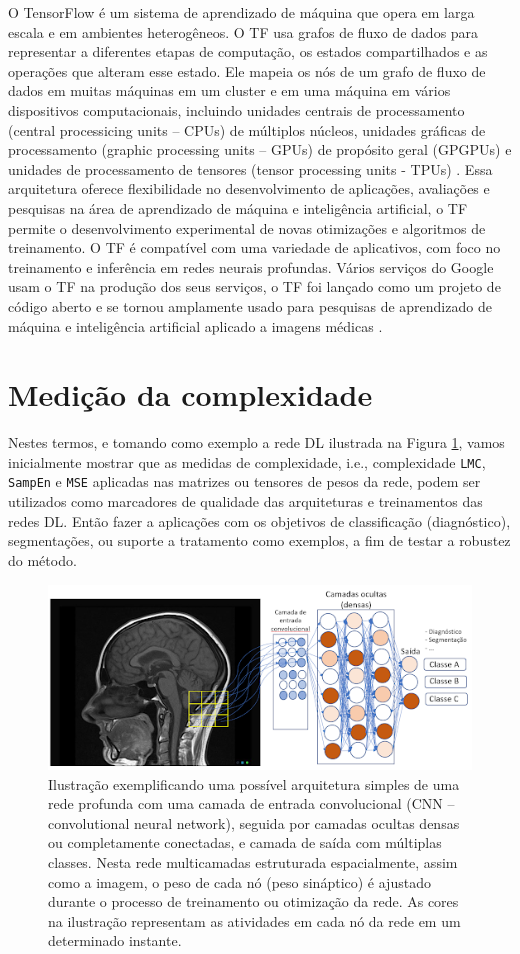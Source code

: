 \documentclass[
	12pt,				%
	openany,oneside,
	a4paper,			%
	english,			%
	brazil,				%
	]{abntex2}
\begin{document}
O TensorFlow é um sistema de aprendizado de máquina que opera em larga escala e em ambientes heterogêneos. O TF usa grafos de fluxo de dados para representar a diferentes etapas de computação, os estados compartilhados e as operações que alteram esse estado. Ele mapeia os nós de um grafo de fluxo de dados em muitas máquinas em um cluster e em uma máquina em vários dispositivos computacionais, incluindo unidades centrais de processamento (central processicing units – CPUs) de múltiplos núcleos, unidades gráficas de processamento (graphic processing units – GPUs) de propósito geral (GPGPUs) e unidades  de processamento de tensores (tensor processing units - TPUs) \cite{c36}. Essa arquitetura oferece flexibilidade no desenvolvimento de aplicações, avaliações e pesquisas na área de aprendizado de máquina e inteligência artificial, o TF permite o desenvolvimento experimental de novas otimizações e algoritmos de treinamento. O TF é compatível com uma variedade de aplicativos, com foco no treinamento e inferência em redes neurais profundas. Vários serviços do Google usam o TF na produção dos seus serviços, o TF foi lançado como um projeto de código aberto e se tornou amplamente usado para pesquisas de aprendizado de máquina e inteligência artificial aplicado a imagens médicas \cite{c37, c38}.


\section{Medição da complexidade}
Nestes termos, e tomando como exemplo a rede DL ilustrada na Figura \ref{fig1}, vamos inicialmente mostrar que as medidas de complexidade, i.e., complexidade \texttt{LMC}, \texttt{SampEn} e \texttt{MSE} aplicadas nas matrizes ou tensores de pesos da rede, podem ser utilizados como marcadores de qualidade das arquiteturas e treinamentos das redes DL. Então fazer a aplicações com os objetivos de classificação (diagnóstico), segmentações, ou suporte a tratamento como exemplos, a fim de testar a robustez do método. 

\begin{figure}
\includegraphics[width=.9\textwidth]{image1}
\caption{\label{fig1}Ilustração exemplificando uma possível arquitetura simples de uma rede profunda com uma camada de entrada convolucional (CNN – convolutional neural network), seguida por camadas ocultas densas ou completamente conectadas, e camada de saída com múltiplas classes. Nesta rede multicamadas estruturada espacialmente, assim como a imagem, o peso de cada nó (peso sináptico) é ajustado durante o processo de treinamento ou otimização da rede. As cores na ilustração representam as atividades em cada nó da rede em um determinado instante.}
\end{figure}
\end{document}
